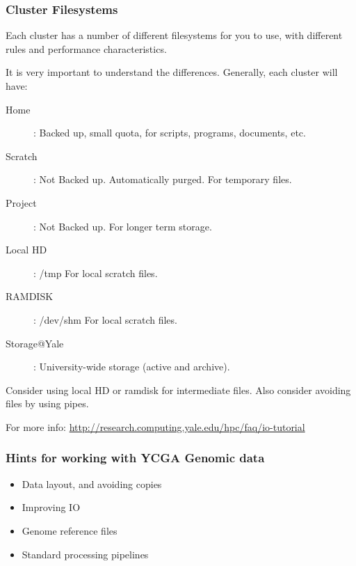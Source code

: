\documentclass[10pt]{beamer}
\begin{document}
\begin{frame}[fragile]
\frametitle{Cluster Filesystems}
Each cluster has a number of different filesystems for you to use, with different
rules and performance characteristics.  

\vskip10pt

It is very important to understand the differences.  Generally, each cluster will have:

\begin{description}
\item[Home]: Backed up, small quota, for scripts, programs, documents, etc.
\item[Scratch]: Not Backed up.  Automatically purged.  For temporary files.
\item[Project]: Not Backed up.  For longer term storage.
\item[Local HD]: /tmp  For local scratch files.
\item[RAMDISK]: /dev/shm For local scratch files.
\item[Storage@Yale]: University-wide storage (active and archive).
\end{description}

Consider using local HD or ramdisk for intermediate files.  Also consider avoiding files by using pipes.

For more info: \url{http://research.computing.yale.edu/hpc/faq/io-tutorial}

\end{frame}

\begin{frame}[fragile]
\frametitle{Hints for working with YCGA Genomic data}
\begin{itemize}
\item Data layout, and avoiding copies
\item Improving IO
\item Genome reference files
\item Standard processing pipelines
\end{itemize}
\end{frame}
\end{document}
